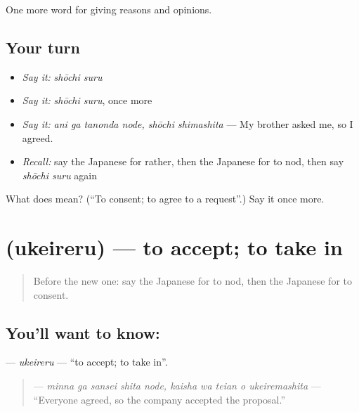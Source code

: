 \begin{grammarlens}[title={What you've built}]
One more word for giving reasons and opinions.
\end{grammarlens}

\subsection*{Your turn}
\begin{itemize}
\raggedright
  \item \emph{Say it:} \emph{shōchi suru}
  \item \emph{Say it:} \emph{shōchi suru}, once more
  \item \emph{Say it:} \emph{ani ga tanonda node, shōchi shimashita} — My brother asked me, so I agreed.
  \item \emph{Recall:} say the Japanese for rather, then the Japanese for to nod, then say \emph{shōchi suru} again
\end{itemize}

\begin{tcolorbox}[breakable,colback=teal!4,colframe=teal!35!black,title={Before you move on}]
What does  mean? (\textquotedblleft{}To consent; to agree to a request\textquotedblright{}.) Say it once more.
\end{tcolorbox}
\section[\texorpdfstring{\ja{うけいれる} (ukeireru)}{うけいれる (ukeireru)}]{ (ukeireru) — to accept; to take in}

\label{lesson:JA-C322-ukeireru}



\begin{quote}
Before the new one: say the Japanese for to nod, then the Japanese for to consent.
\end{quote}

\subsection*{You'll want to know: }
\textbf{} — \emph{ukeireru} — \textquotedblleft{}to accept; to take in\textquotedblright{}.

\begin{quote}
\textbf{   } — \emph{minna ga sansei shita node, kaisha wa teian o ukeiremashita} — \textquotedblleft{}Everyone agreed, so the company accepted the proposal.\textquotedblright{}
\end{quote}

